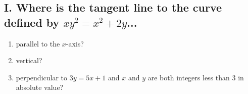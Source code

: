 \documentclass{article}
\begin{document}
\subsection*{I. Where is the tangent line to the curve defined by $xy^{2}=x^{2}+2y$...}

\begin{enumerate}
\item parallel to the $x$-axis?
\item vertical?
\item perpendicular to $3y=5x+1$ and $x$ and $y$ are both integers less than 3 in absolute value?
\end{enumerate}







\end{document}
